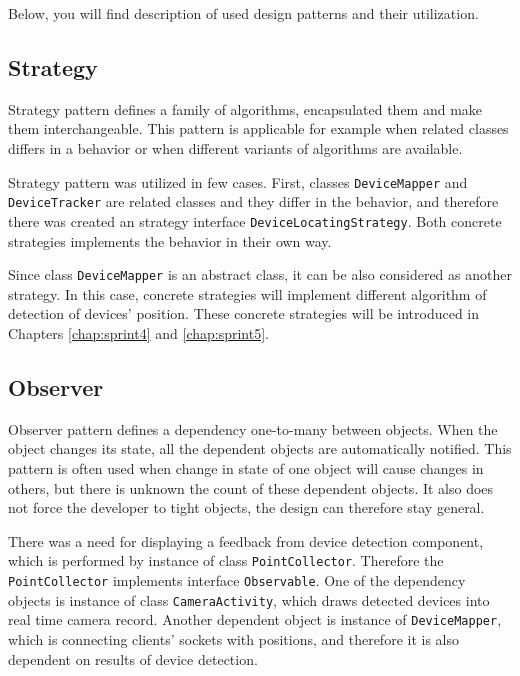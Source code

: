 Below, you will find description of used design patterns and their utilization.

\subsection{Strategy}
Strategy pattern defines a family of algorithms, encapsulated them and make them interchangeable\cite[p.~349]{Gamma:1995:DPE:186897}.
This pattern is applicable for example when related classes differs in a behavior or when different variants of algorithms are available.

Strategy pattern was utilized in few cases.
First, classes \texttt{DeviceMapper} and \texttt{DeviceTracker} are related classes and they differ in the behavior, and therefore there was created an strategy interface \texttt{DeviceLocatingStrategy}.
Both concrete strategies implements the behavior in their own way.

Since class \texttt{DeviceMapper} is an abstract class, it can be also considered as another strategy.
In this case, concrete strategies will implement different algorithm of detection of devices' position.
These concrete strategies will be introduced in Chapters \ref{chap:sprint4} and \ref{chap:sprint5}.

\subsection{Observer}
Observer pattern defines a dependency one-to-many between objects.
When the object changes its state, all the dependent objects are automatically notified.
This pattern is often used when change in state of one object will cause changes in others, but there is unknown the count of these dependent objects.
It also does not force the developer to tight objects, the design can therefore stay general. \cite[p.~327]{Gamma:1995:DPE:186897}

There was a need for displaying a feedback from device detection component, which is performed by instance of class \texttt{PointCollector}.
Therefore the \texttt{PointCollector} implements interface \texttt{Observable}.
One of the dependency objects is instance of class \texttt{CameraActivity}, which draws detected devices into real time camera record.
Another dependent object is instance of \texttt{DeviceMapper}, which is connecting clients' sockets with positions, and therefore it is also dependent on results of device detection.